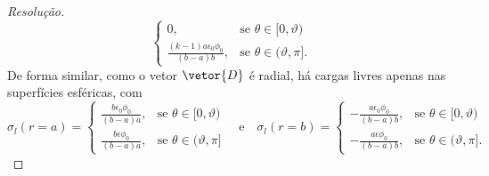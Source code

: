\begin{proof}[Resolução]
\begin{equation*}
\begin{cases}
            0,&\text{se }\theta \in [0, \vartheta)\\
            \frac{(k - 1)a \epsilon_0 \phi_0}{(b - a)b}, &\text{se }\theta \in (\vartheta, \pi].
        \end{cases}
    \end{equation*}
    De forma similar, como o vetor \(\vetor{D}\) é radial, há cargas livres apenas nas superfícies esféricas, com
    \begin{equation*}
        \sigma_l(r = a) = \begin{cases}
            \frac{b \epsilon_0 \phi_0}{(b-a)a},&\text{se }\theta \in [0, \vartheta)\\
            \frac{b \epsilon \phi_0}{(b - a)a}, &\text{se }\theta \in (\vartheta, \pi]
        \end{cases}
        \quad\text{e}\quad
        \sigma_l(r = b) = \begin{cases}
            -\frac{a \epsilon_0 \phi_0}{(b - a)b},&\text{se }\theta \in [0, \vartheta)\\
            -\frac{a \epsilon \phi_0}{(b - a)b}, &\text{se }\theta \in (\vartheta, \pi].
        \end{cases}
    \end{equation*}


\end{proof}
